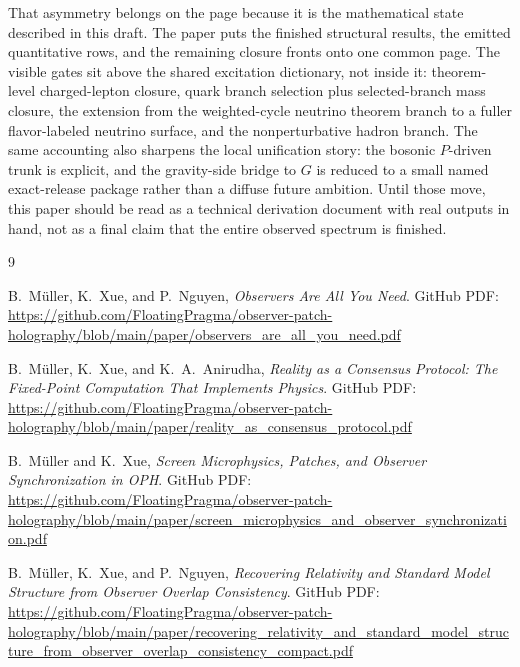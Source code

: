 \documentclass[11pt]{article}
\begin{document}
That asymmetry belongs on the page because it is the mathematical state described in
this draft. The paper puts the finished structural results, the emitted quantitative rows, and the
remaining closure fronts onto one common page. The visible gates sit above the shared
excitation dictionary, not inside it: theorem-level charged-lepton closure, quark branch
selection plus selected-branch mass closure, the extension from the weighted-cycle neutrino theorem
branch to a fuller flavor-labeled neutrino surface, and the nonperturbative hadron branch. The same accounting also sharpens the local unification story:
the bosonic \(P\)-driven trunk is explicit, and the gravity-side bridge to \(G\) is reduced to a
small named exact-release package rather than a diffuse future ambition. Until those move, this paper should be read as a technical
derivation document with real outputs in hand, not as a final claim that the entire observed
spectrum is finished.

\appendix


\begin{thebibliography}{9}

B.\ M\"uller, K.\ Xue, and P.\ Nguyen,
\emph{Observers Are All You Need}.
GitHub PDF:
\url{https://github.com/FloatingPragma/observer-patch-holography/blob/main/paper/observers_are_all_you_need.pdf}

B.\ M\"uller, K.\ Xue, and K.\ A.\ Anirudha,
\emph{Reality as a Consensus Protocol: The Fixed-Point Computation That Implements Physics}.
GitHub PDF:
\url{https://github.com/FloatingPragma/observer-patch-holography/blob/main/paper/reality_as_consensus_protocol.pdf}

B.\ M\"uller and K.\ Xue,
\emph{Screen Microphysics, Patches, and Observer Synchronization in OPH}.
GitHub PDF:
\url{https://github.com/FloatingPragma/observer-patch-holography/blob/main/paper/screen_microphysics_and_observer_synchronization.pdf}

B.\ M\"uller, K.\ Xue, and P.\ Nguyen,
\emph{Recovering Relativity and Standard Model Structure from Observer Overlap Consistency}.
GitHub PDF:
\url{https://github.com/FloatingPragma/observer-patch-holography/blob/main/paper/recovering_relativity_and_standard_model_structure_from_observer_overlap_consistency_compact.pdf}

\end{thebibliography}
\end{document}
